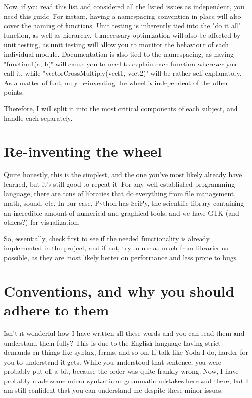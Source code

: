 \documentclass[10pt,a4paper]{article}
\begin{document}
Now, if you read this list and considered all the listed issues as independent, you need this guide. For instant, having a namespacing convention in place will also cover the naming of functions. Unit testing is inherently tied into the "do it all" function, as well as hierarchy. Unnecessary optimization will also be affected by unit testing, as unit testing will allow you to monitor the behaviour of each individual module. Documentation is also tied to the namespacing, as having "function1(a, b)" will cause you to need to explain each function wherever you call it, while "vectorCrossMultiply(vect1, vect2)" will be rather self explanatory. As a matter of fact, only re-inventing the wheel is independent of the other points.

Therefore, I will split it into the most critical components of each subject, and handle each separately.

\section{Re-inventing the wheel}
Quite honestly, this is the simplest, and the one you've most likely already have learned, but it's still good to repeat it. For any well established programming language, there are tons of libraries that do everything from file management, math, sound, etc. In our case, Python has SciPy, the scientific library containing an incredible amount of numerical and graphical tools, and we have GTK (and others?) for visualization.

So, essentially, check first to see if the needed functionality is already implemented in the project, and if not, try to use as much from libraries as possible, as they are most likely better on performance and less prone to bugs.

\section{Conventions, and why you should adhere to them}
Isn't it wonderful how I have written all these words and you can read them and understand them fully? This is due to the English language having strict demands on things like syntax, forms, and so on. If talk like Yoda I do, harder for you to understand it gets. While you understood that sentence, you were probably put off a bit, because the order was quite frankly wrong. Now, I have probably made some minor syntactic or grammatic mistakes here and there, but I am still confident that you can understand me despite these minor issues. 
\end{document}
